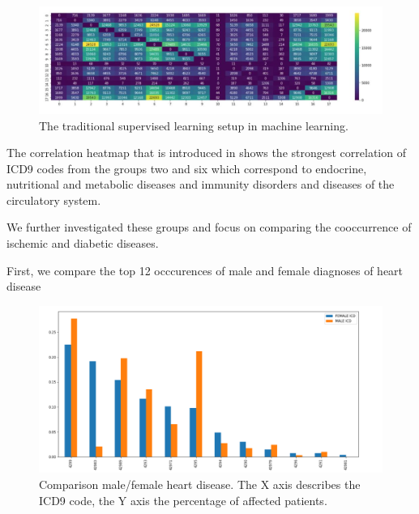 \documentclass[11pt, a4paper]{book}
\begin{document}
\begin{figure}
  \begin{center}
  \includegraphics[width=1\textwidth]{img/correlation-heatmap.png}
  \caption{The traditional supervised learning setup in machine learning. \cite{Ruder2019}}
  \label{fig:transfer_learning_no}
  \end{center}
\end{figure}

The correlation heatmap that is introduced in \cite{arya2019exploratory}
shows the strongest correlation of ICD9 codes from the groups two and six which correspond to endocrine, nutritional and metabolic diseases and immunity disorders and diseases of the circulatory system.

We further investigated  these groups and focus on comparing the cooccurrence of ischemic and diabetic diseases. 

First, we compare the top 12 occcurences of male and female diagnoses of heart disease

\begin{figure}
  \begin{center}
  \includegraphics[width=1\textwidth]{img/male_female_heart_disease.png}
  \caption{Comparison male/female heart disease. The X axis describes the ICD9 code, the Y axis the percentage of affected patients.}
  \label{fig:heart_disease_comparison}
  \end{center}
\end{figure}
\end{document}
